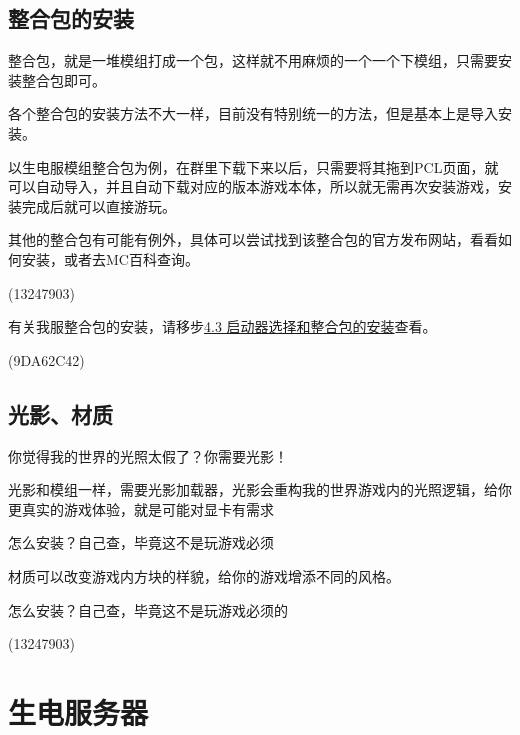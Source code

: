 \documentclass[UTF8,a4paper]{article}
\begin{document}
		\subsection{整合包的安装}
			\par 整合包，就是一堆模组打成一个包，这样就不用麻烦的一个一个下模组，只需要安装整合包即可。
			\par 各个整合包的安装方法不大一样，目前没有特别统一的方法，但是基本上是导入安装。
			\par 以生电服模组整合包为例，在群里下载下来以后，只需要将其拖到PCL页面，就可以自动导入，并且自动下载对应的版本游戏本体，所以就无需再次安装游戏，安装完成后就可以直接游玩。
			\par 其他的整合包有可能有例外，具体可以尝试找到该整合包的官方发布网站，看看如何安装，或者去MC百科查询。
			\begin{flushright}(13247903)\end{flushright}
			\par 有关我服整合包的安装，请移步\hyperlink{qidongqixuanze}{4.3 启动器选择和整合包的安装}查看。
			\begin{flushright}(9DA62C42)\end{flushright}
		\subsection{光影、材质}
			\hypertarget{guangying}{}
			\par 你觉得我的世界的光照太假了？你需要光影！
			\par 光影和模组一样，需要光影加载器，光影会重构我的世界游戏内的光照逻辑，给你更真实的游戏体验，就是可能对显卡有需求
			\par 怎么安装？自己查，毕竟这不是玩游戏必须
			\par 材质可以改变游戏内方块的样貌，给你的游戏增添不同的风格。
			\par 怎么安装？自己查，毕竟这不是玩游戏必须的
			\begin{flushright}(13247903)\end{flushright}
	\section{生电服务器}
\end{document}
